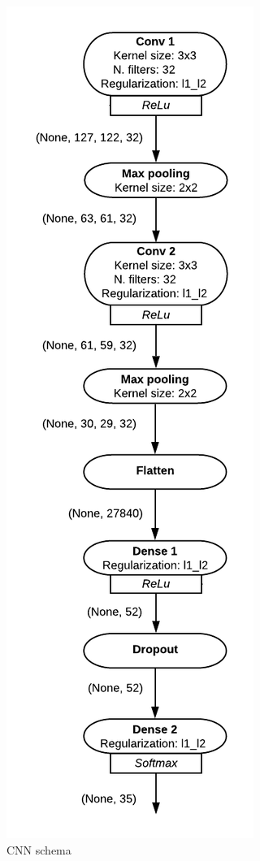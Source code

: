 \begin{figure}[ht]
	\centering
	\includegraphics[scale=0.6]{CNN_schema}
	\caption{CNN schema}
	\label{fig:CNN_schema}
\end{figure} 

